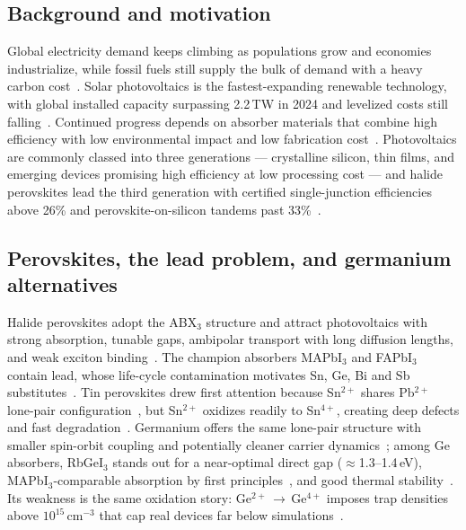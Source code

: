 \documentclass[review]{elsarticle}
\begin{document}
\subsection{Background and motivation}
Global electricity demand keeps climbing as populations grow and economies industrialize, while fossil fuels still supply the bulk of demand with a heavy carbon cost~\cite{r1,r2}. Solar photovoltaics is the fastest-expanding renewable technology, with global installed capacity surpassing 2.2\,TW in 2024 and levelized costs still falling~\cite{r3}. Continued progress depends on absorber materials that combine high efficiency with low environmental impact and low fabrication cost~\cite{r4}. Photovoltaics are commonly classed into three generations --- crystalline silicon, thin films, and emerging devices promising high efficiency at low processing cost --- and halide perovskites lead the third generation with certified single-junction efficiencies above 26\% and perovskite-on-silicon tandems past 33\%~\cite{r3,r5,r6}.

\subsection{Perovskites, the lead problem, and germanium alternatives}
Halide perovskites adopt the ABX$_{3}$ structure and attract photovoltaics with strong absorption, tunable gaps, ambipolar transport with long diffusion lengths, and weak exciton binding~\cite{r7,r8}. The champion absorbers MAPbI$_{3}$ and FAPbI$_{3}$ contain lead, whose life-cycle contamination motivates Sn, Ge, Bi and Sb substitutes~\cite{r9,r10,r11,r12}. Tin perovskites drew first attention because Sn$^{2+}$ shares Pb$^{2+}$ lone-pair configuration~\cite{r11}, but Sn$^{2+}$ oxidizes readily to Sn$^{4+}$, creating deep defects and fast degradation~\cite{r11,r12}. Germanium offers the same lone-pair structure with smaller spin-orbit coupling and potentially cleaner carrier dynamics~\cite{r13}; among Ge absorbers, RbGeI$_{3}$ stands out for a near-optimal direct gap ($\approx$1.3--1.4\,eV), MAPbI$_{3}$-comparable absorption by first principles~\cite{r17,r18}, and good thermal stability~\cite{r14,r15,r16}. Its weakness is the same oxidation story: Ge$^{2+}$\,$\rightarrow$\,Ge$^{4+}$ imposes trap densities above $10^{15}$\,cm$^{-3}$ that cap real devices far below simulations~\cite{r23pathak}.
\end{document}
